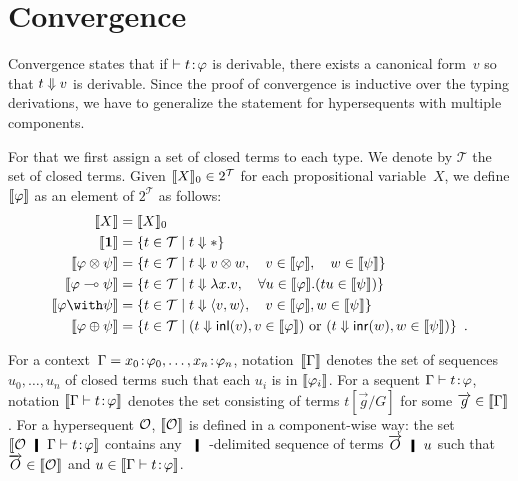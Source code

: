 \section{Convergence}
\label{sec:convergence}

Convergence states that if
$\vdash{t} \mathord{\colon\kern -2pt}{\varphi}$ is derivable,
there exists a canonical form~$v$ so that $t\Downarrow v$ is derivable.
Since the proof of convergence is inductive over
the typing derivations, we have to generalize the statement for
hypersequents with multiple components.

For that we first assign a set of closed terms to each type.
\newcommand{\terms}{\mathcal{T}}
We denote by $\terms$ the set of closed terms.
Given $\semo{X}_0\in 2^\terms$ for each propositional variable~$X$,
we define $\llbracket{\varphi}\rrbracket$ as an element of ${2^\terms}$
as follows:
\begin{align*}
 \semo{X} &= \semo{X}_0\\
 \semo{\one} &= \{t\in \terms \mid t\eval \ast\} \\
 \semo{\phi\otimes \psi}&= \{t\in\terms \mid t\eval v\otimes w,\quad
 v\in\semo{\phi},\quad w\in \semo{\psi}\}\\
 \semo{\phi\limp\psi}&= \{t\in\terms \mid t\eval \lambda x.v,\quad
 \forall u\in\semo{\phi}.(tu\in\semo{\psi})\}\\
 \semo{\phi\with\psi}&= \{t\in\terms \mid t\eval\lpair{v,w},\quad
 v\in\semo{\phi}, w\in\semo{\psi}\}\\
 \semo{\phi\oplus\psi}&= \{t\in\terms\mid (t\eval \inl{v}, v\in
 \semo{\phi})\text{ or }(t\eval\inr{w}, w \in \semo{\psi})\}\enspace.
\end{align*}

For a context~$\Gamma = {x_0} \mathord{\colon\kern -2pt}{\varphi_0},\ldots,{x_n} \mathord{\colon\kern -2pt}{\varphi_n}$,
notation~$\llbracket{\Gamma}\rrbracket$ denotes the set of sequences $u_0,\ldots,u_n$
of closed terms
such that each $u_i$ is in $\llbracket{\varphi_i}\rrbracket$.
For a sequent $\Gamma\vdash{t} \mathord{\colon\kern -2pt}{\varphi}$, notation $\llbracket{\Gamma\vdash {t} \mathord{\colon\kern -2pt}{\varphi} }\rrbracket$ denotes
the set consisting of terms $t[\vec g/G]$ for some $\overrightarrow g\in\llbracket{\Gamma}\rrbracket$.
For a hypersequent $\mathcal{O}$,
$\llbracket{\mathcal{O}}\rrbracket$ is defined in a component-wise way: the set
$\semo{\hypert\hmid\G\tr\tj t\phi}$ contains any {\kern
-6pt}$\hmid${\kern -6pt}-delimited
sequence of terms
$\vec O \hmid u$ such that $\overrightarrow O\in\llbracket{\mathcal{O}}\rrbracket$ and
$u\in\llbracket{\Gamma\vdash {t} \mathord{\colon\kern -2pt}{\varphi} }\rrbracket$.

